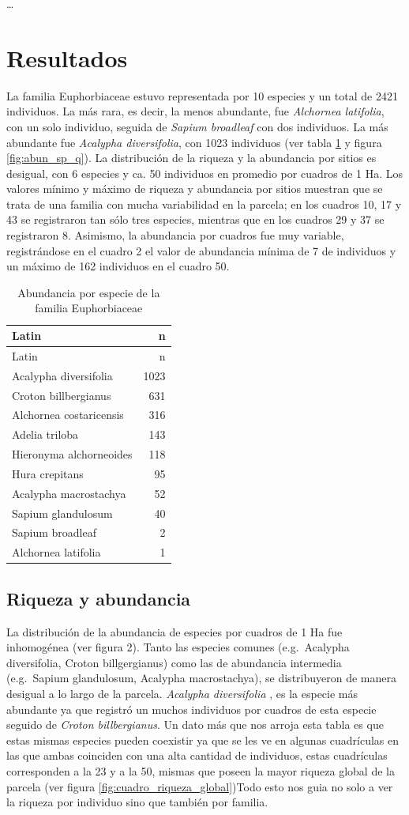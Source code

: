 \documentclass[11pt,]{article}
\begin{document}
\ldots

\section{Resultados}\label{resultados}

La familia Euphorbiaceae estuvo representada por 10 especies y un total
de 2421 individuos. La más rara, es decir, la menos abundante, fue
\emph{Alchornea latifolia}, con un solo individuo, seguida de
\emph{Sapium broadleaf} con dos individuos. La más abundante fue
\emph{Acalypha diversifolia}, con 1023 individuos (ver tabla
\ref{tab:tabla_de_abundancia} y figura \ref{fig:abun_sp_q}). La
distribución de la riqueza y la abundancia por sitios es desigual, con 6
especies y ca. 50 individuos en promedio por cuadros de 1 Ha. Los
valores mínimo y máximo de riqueza y abundancia por sitios muestran que
se trata de una familia con mucha variabilidad en la parcela; en los
cuadros 10, 17 y 43 se registraron tan sólo tres especies, mientras que
en los cuadros 29 y 37 se registraron 8. Asimismo, la abundancia por
cuadros fue muy variable, registrándose en el cuadro 2 el valor de
abundancia mínima de 7 de individuos y un máximo de 162 individuos en el
cuadro 50.

\begin{longtable}[]{@{}lr@{}}
\caption{\label{tab:tabla_de_abundancia}Abundancia por especie de la
familia Euphorbiaceae}\tabularnewline
\toprule
Latin & n\tabularnewline
\midrule
\endfirsthead
\toprule
Latin & n\tabularnewline
\midrule
\endhead
Acalypha diversifolia & 1023\tabularnewline
Croton billbergianus & 631\tabularnewline
Alchornea costaricensis & 316\tabularnewline
Adelia triloba & 143\tabularnewline
Hieronyma alchorneoides & 118\tabularnewline
Hura crepitans & 95\tabularnewline
Acalypha macrostachya & 52\tabularnewline
Sapium glandulosum & 40\tabularnewline
Sapium broadleaf & 2\tabularnewline
Alchornea latifolia & 1\tabularnewline
\bottomrule
\end{longtable}

\subsection{Riqueza y abundancia}\label{riqueza-y-abundancia}

La distribución de la abundancia de especies por cuadros de 1 Ha fue
inhomogénea (ver figura 2). Tanto las especies comunes (e.g.~Acalypha
diversifolia, Croton billgergianus) como las de abundancia intermedia
(e.g.~Sapium glandulosum, Acalypha macrostachya), se distribuyeron de
manera desigual a lo largo de la parcela. \emph{Acalypha diversifolia} ,
es la especie más abundante ya que registró un muchos individuos por
cuadros de esta especie seguido de \emph{Croton billbergianus}. Un dato
más que nos arroja esta tabla es que estas mismas especies pueden
coexistir ya que se les ve en algunas cuadrículas en las que ambas
coinciden con una alta cantidad de individuos, estas cuadrículas
corresponden a la 23 y a la 50, mismas que poseen la mayor riqueza
global de la parcela (ver figura \ref{fig:cuadro_riqueza_global})Todo
esto nos guia no solo a ver la riqueza por individuo sino que también
por familia.
\end{document}
